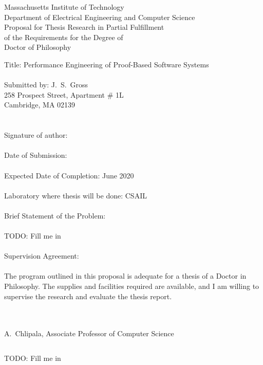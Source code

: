 \documentclass{article}
\begin{document}
\thispagestyle{empty}
\begin{center}
Massachusetts Institute of Technology \\
Department of Electrical Engineering and Computer Science \\ $\left.\right.$ \\
Proposal for Thesis Research in Partial Fulfillment \\
of the Requirements for the Degree of \\
Doctor of Philosophy
\end{center}
\noindent Title: Performance Engineering of Proof-Based Software Systems \\ \\
Submitted by: J.~S.~Gross \\
\phantom{Submitted by: }258 Prospect Street, Apartment \# 1L \\
\phantom{Submitted by: }Cambridge, MA 02139 \\ \\ \\
Signature of author: \underline{\hspace{20em}} \\ \\
Date of Submission: \proposaldate \\ \\
Expected Date of Completion: June 2020 \\ \\
Laboratory where thesis will be done: CSAIL \\ \\
Brief Statement of the Problem: \\ \\
TODO: Fill me in \\ \\
Supervision Agreement: \\ \\
The program outlined in this proposal is adequate for a thesis of a Doctor in Philosophy.
The supplies and facilities required are available, and I am willing to supervise the research and evaluate the thesis report. \\ \\
\begin{flushright}
\underline{\hspace*{25em}} \\ $\left.\right.$ \\
A.~Chlipala, Associate Professor of Computer Science
\end{flushright}
\clearpage
$\left.\right.$
\clearpage

TODO: Fill me in

\nocite{*}


\end{document}
